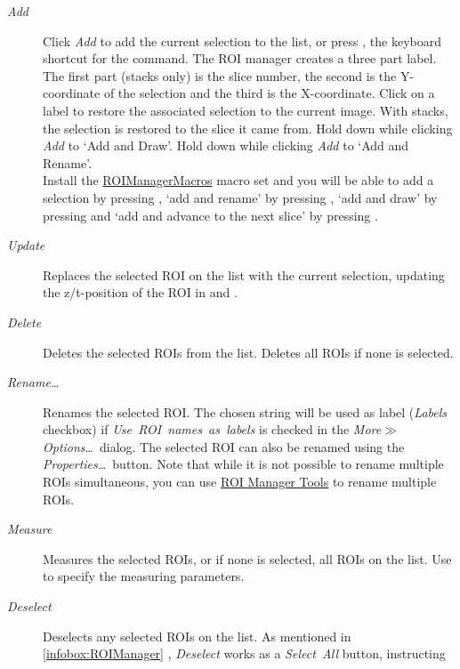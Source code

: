 \begin{description}
\item [{\emph{Add}}] Click \emph{Add} to add the current selection to the
list, or press , the keyboard shortcut for the 
command. The ROI manager creates a three part label. The first part
(stacks only) is the slice number, the second is the Y-coordinate
of the selection and the third is the X-coordinate. Click on a label
to restore the associated selection to the current image. With stacks,
the selection is restored to the slice it came from. Hold down 
while clicking \emph{Add} to `Add and Draw'. Hold down 
while clicking \emph{Add} to `Add and Rename'.\\
Install the \href{http://imagej.nih.gov/ij/macros/RoiManagerMacros.txt}{ROIManagerMacros}
macro set and you will be able to add a selection by pressing ,
`add and rename' by pressing , `add and draw'
by pressing  and `add and advance to the next slice'
by pressing .
\item [{\emph{Update}}] Replaces the selected ROI on the list with the
current selection, updating the z/t-position of the ROI in 
and .
\item [{\emph{Delete}}] \improvement{}Deletes the selected ROIs from the
list. Deletes all ROIs if none is selected.
\item [{\emph{\label{misc:RM-Rename}Rename\ldots{}}}] Renames
the selected ROI. The chosen string will be used as label (\emph{Labels}
checkbox) if \emph{Use\ ROI\ names\ as\ labels }is checked in
the \emph{More$\gg$Options}\ldots{}\ dialog. The selected ROI can
also be renamed using the \emph{Properties\ldots{}}\ button. Note
that while it is not possible to rename multiple ROIs simultaneous,
you can use \href{http://imagej.nih.gov/ij/plugins/roi-manager-tools/index.html}{ROI Manager Tools}
to rename multiple ROIs.
\item [{\emph{Measure}}] Measures the selected ROIs, or if none is selected,
all ROIs on the list. Use 
to specify the measuring parameters. 
\item [{\emph{Deselect}}] \improvement{}Deselects any selected ROIs on
the list. As mentioned in \ref{infobox:ROIManager} ,
\emph{Deselect} works as a \emph{Select~All }button, instructing

\end{description}

